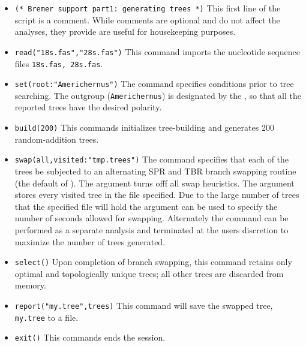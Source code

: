 \begin{itemize}
\item \texttt{(* Bremer support part1: generating trees *)} This first line of the script is a comment. While comments are optional and do not affect the analyses, they provide are useful for housekeeping purposes. 
\item \texttt{read("18s.fas","28s.fas")} This command imports the nucleotide sequence files \texttt{18s.fas, 28s.fas}.
\item \texttt{set(root:"Americhernus")} The  command specifies conditions prior to tree searching. The outgroup (\texttt{Americhernus}) is designated by the , so that all the reported trees have the desired polarity.     
\item \texttt{build(200)} This commands initializes tree-building and generates 200 random-addition trees.      
\item \texttt{swap(all,visited:"tmp.trees")} The  command specifies that each of the trees be subjected to an alternating SPR and TBR branch swapping routine (the default of \poy).  The  argument turns offf all swap heuristics. The  argument stores every visited tree in the file specified.  Due to the large number of trees that the specified file will hold the argument  can be used to specify the number of seconds allowed for swapping.  Alternately  the   command can be performed as a separate analysis and terminated at the users discretion to maximize the number of trees generated.
\item \texttt{select()} Upon completion of branch swapping, this command retains only optimal and topologically unique trees; all other trees are discarded from memory. 
\item \texttt{report("my.tree",trees)} This command will save the swapped tree, \\ \texttt{my.tree} to a file. 
\item \texttt{exit()} This commands ends the \poy session.


\end{itemize}
